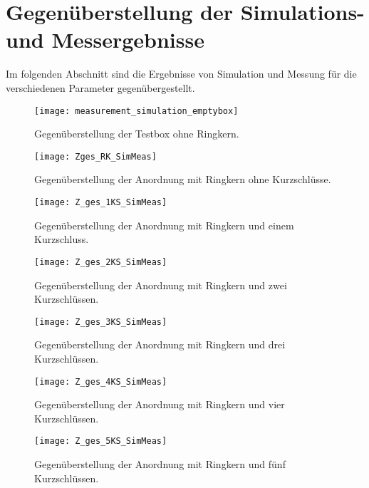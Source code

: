 \section{Gegen\"uberstellung der Simulations- und Messergebnisse}
\label{sec:simmesskomplett}
Im folgenden Abschnitt sind die Ergebnisse von Simulation und Messung für die verschiedenen Parameter gegenübergestellt.

\begin{figure}[htb]
	\centering
	\texttt{[image: measurement\_simulation\_emptybox]}
	\caption{Gegen\"uberstellung der Testbox ohne Ringkern.}
	\label{fig:boxpolycrossrkappend}
\end{figure}

\begin{figure}[htb]
	\centering
	\texttt{[image: Zges\_RK\_SimMeas]}
	\caption{Gegen\"uberstellung der Anordnung mit Ringkern ohne Kurzschl\"usse.}
	\label{fig:boxpolycrossrkappend}
\end{figure}

\begin{figure}[htb]
	\centering
	\texttt{[image: Z\_ges\_1KS\_SimMeas]}
	\caption{Gegen\"uberstellung der Anordnung mit Ringkern und einem Kurzschluss.}
	\label{fig:boxpolycrossrk1ksappend}
\end{figure}

\begin{figure}[htb]
	\centering
	\texttt{[image: Z\_ges\_2KS\_SimMeas]}
	\caption{Gegen\"uberstellung der Anordnung mit Ringkern und zwei Kurzschl\"ussen.}
	\label{fig:boxpolycrossrk2ksappend}
\end{figure}

\begin{figure}[htb]
	\centering
	\texttt{[image: Z\_ges\_3KS\_SimMeas]}
	\caption{Gegen\"uberstellung der Anordnung mit Ringkern und drei Kurzschl\"ussen.}
	\label{fig:boxpolycrossrk3ksappend}
\end{figure}

\begin{figure}[htb]
	\centering
	\texttt{[image: Z\_ges\_4KS\_SimMeas]}
	\caption{Gegen\"uberstellung der Anordnung mit Ringkern und vier Kurzschl\"ussen.}
	\label{fig:boxpolycrossrk4ksappend}
\end{figure}

\begin{figure}[htb]
	\centering
	\texttt{[image: Z\_ges\_5KS\_SimMeas]}
	\caption{Gegen\"uberstellung der Anordnung mit Ringkern und f\"unf Kurzschl\"ussen.}
	\label{fig:boxpolycrossrk5ksappend}
\end{figure}

